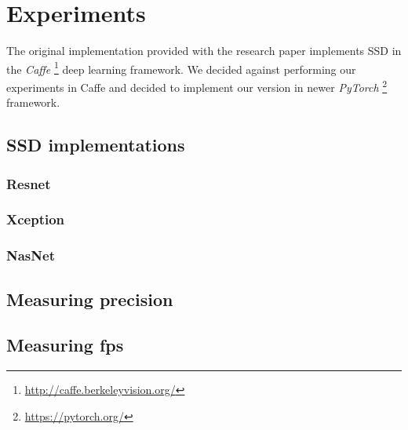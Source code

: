 \chapter{Experiments}

The original implementation provided with the research paper implements SSD in the \textit{Caffe} \footnote{\url{http://caffe.berkeleyvision.org/}} deep learning framework. We decided against performing our experiments in Caffe and decided to implement our version in newer \textit{PyTorch} \footnote{\url{https://pytorch.org/}} framework. 




\section{SSD implementations}
\subsection{Resnet}
\subsection{Xception}
\subsection{NasNet}

\section{Measuring precision}

\section{Measuring fps}